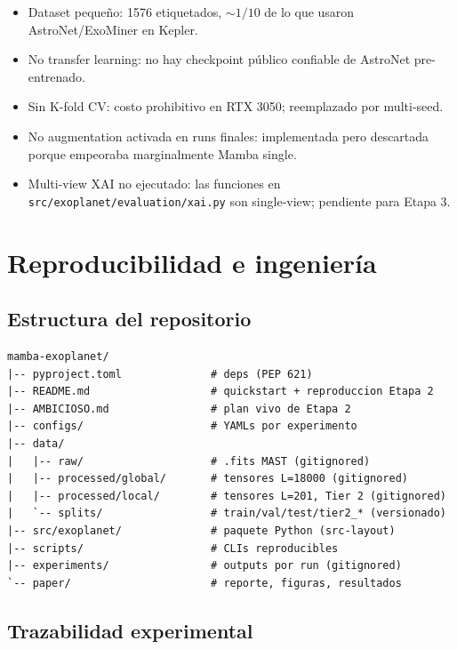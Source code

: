\documentclass[11pt, a4paper]{article}
\begin{document}
\begin{itemize}[leftmargin=*, topsep=0pt]
    \item Dataset pequeño: 1576 etiquetados, $\sim 1/10$ de lo que usaron AstroNet/ExoMiner en Kepler.
    \item No transfer learning: no hay checkpoint público confiable de AstroNet pre-entrenado.
    \item Sin K-fold CV: costo prohibitivo en RTX 3050; reemplazado por multi-seed.
    \item No augmentation activada en runs finales: implementada pero descartada porque empeoraba marginalmente Mamba single.
    \item Multi-view XAI no ejecutado: las funciones en \texttt{src/exoplanet/evaluation/xai.py} son single-view; pendiente para Etapa 3.
\end{itemize}

\section{Reproducibilidad e ingeniería}

\subsection{Estructura del repositorio}

\begin{lstlisting}[basicstyle=\ttfamily\footnotesize]
mamba-exoplanet/
|-- pyproject.toml              # deps (PEP 621)
|-- README.md                   # quickstart + reproduccion Etapa 2
|-- AMBICIOSO.md                # plan vivo de Etapa 2
|-- configs/                    # YAMLs por experimento
|-- data/
|   |-- raw/                    # .fits MAST (gitignored)
|   |-- processed/global/       # tensores L=18000 (gitignored)
|   |-- processed/local/        # tensores L=201, Tier 2 (gitignored)
|   `-- splits/                 # train/val/test/tier2_* (versionado)
|-- src/exoplanet/              # paquete Python (src-layout)
|-- scripts/                    # CLIs reproducibles
|-- experiments/                # outputs por run (gitignored)
`-- paper/                      # reporte, figuras, resultados
\end{lstlisting}

\subsection{Trazabilidad experimental}
\end{document}
